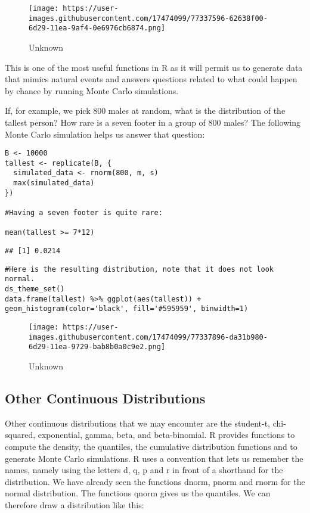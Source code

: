 \documentclass[
]{article}
\begin{document}
\begin{figure}
\centering
\texttt{[image: https://user-images.githubusercontent.com/17474099/77337596-62638f00-6d29-11ea-9af4-0e6976cb6874.png]}
\caption{Unknown}
\end{figure}

This is one of the most useful functions in R as it will permit us to
generate data that mimics natural events and answers questions related
to what could happen by chance by running Monte Carlo simulations.

If, for example, we pick 800 males at random, what is the distribution
of the tallest person? How rare is a seven footer in a group of 800
males? The following Monte Carlo simulation helps us answer that
question:

\begin{verbatim}
B <- 10000
tallest <- replicate(B, {
  simulated_data <- rnorm(800, m, s)
  max(simulated_data)
})

#Having a seven footer is quite rare:

mean(tallest >= 7*12)
\end{verbatim}

\begin{verbatim}
## [1] 0.0214
\end{verbatim}

\begin{verbatim}
#Here is the resulting distribution, note that it does not look normal.
ds_theme_set()
data.frame(tallest) %>% ggplot(aes(tallest)) + geom_histogram(color='black', fill='#595959', binwidth=1)
\end{verbatim}

\begin{figure}
\centering
\texttt{[image: https://user-images.githubusercontent.com/17474099/77337896-da31b980-6d29-11ea-9729-bab8b0a0c9e2.png]}
\caption{Unknown}
\end{figure}

\hypertarget{other-continuous-distributions}{%
\subsection{Other Continuous
Distributions}\label{other-continuous-distributions}}

Other continuous distributions that we may encounter are the student-t,
chi-squared, exponential, gamma, beta, and beta-binomial. R provides
functions to compute the density, the quantiles, the cumulative
distribution functions and to generate Monte Carlo simulations. R uses a
convention that lets us remember the names, namely using the letters d,
q, p and r in front of a shorthand for the distribution. We have already
seen the functions dnorm, pnorm and rnorm for the normal distribution.
The functions qnorm gives us the quantiles. We can therefore draw a
distribution like this:
\end{document}
